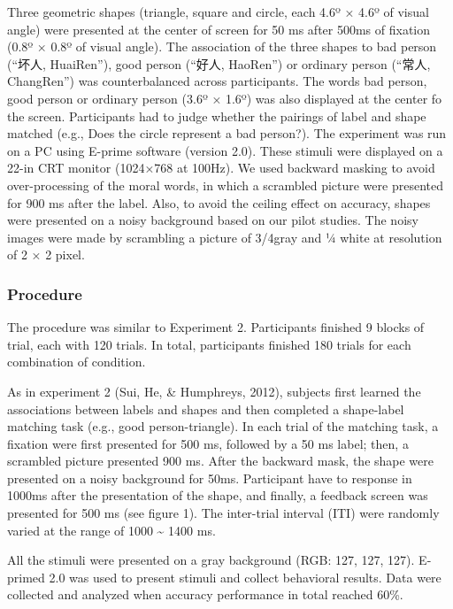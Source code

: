 \documentclass[
  english,
  man]{apa6}
\begin{document}
Three geometric shapes (triangle, square and circle, each 4.6º × 4.6º of visual angle) were presented at the center of screen for 50 ms after 500ms of fixation (0.8º × 0.8º of visual angle). The association of the three shapes to bad person (\enquote{坏人, HuaiRen}), good person (\enquote{好人, HaoRen}) or ordinary person (\enquote{常人, ChangRen}) was counterbalanced across participants. The words bad person, good person or ordinary person (3.6º × 1.6º) was also displayed at the center fo the screen. Participants had to judge whether the pairings of label and shape matched (e.g., Does the circle represent a bad person?). The experiment was run on a PC using E-prime software (version 2.0). These stimuli were displayed on a 22-in CRT monitor (1024×768 at 100Hz).
We used backward masking to avoid over-processing of the moral words, in which a scrambled picture were presented for 900 ms after the label. Also, to avoid the ceiling effect on accuracy, shapes were presented on a noisy background based on our pilot studies. The noisy images were made by scrambling a picture of 3/4gray and ¼ white at resolution of 2 × 2 pixel.

\hypertarget{procedure-9}{%
\subsubsection{Procedure}\label{procedure-9}}

The procedure was similar to Experiment 2. Participants finished 9 blocks of trial, each with 120 trials. In total, participants finished 180 trials for each combination of condition.

As in experiment 2 (Sui, He, \& Humphreys, 2012), subjects first learned the associations between labels and shapes and then completed a shape-label matching task (e.g., good person-triangle). In each trial of the matching task, a fixation were first presented for 500 ms, followed by a 50 ms label; then, a scrambled picture presented 900 ms. After the backward mask, the shape were presented on a noisy background for 50ms. Participant have to response in 1000ms after the presentation of the shape, and finally, a feedback screen was presented for 500 ms (see figure 1). The inter-trial interval (ITI) were randomly varied at the range of 1000 \textasciitilde{} 1400 ms.

All the stimuli were presented on a gray background (RGB: 127, 127, 127). E-primed 2.0 was used to present stimuli and collect behavioral results. Data were collected and analyzed when accuracy performance in total reached 60\%.
\end{document}
